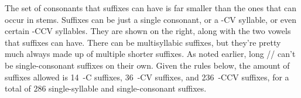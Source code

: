 The
%
set of consonants that suffixes can have is far smaller than the ones that can
occur in stems. Suffixes can be just a single consonant, or a -CV syllable, or
even certain -CCV syllables. They are shown on the right, along with the two
vowels that suffixes can have. There can be multisyllabic suffixes, but they're
pretty much always made up of multiple shorter suffixes. As noted earlier, long
\mbox{//} can't be single-consonant suffixes on their own.
Given the rules below, the amount of suffixes allowed is 14~-C suffixes, 36~-CV
suffixes, and 236~-CCV suffixes, for a total of 286 single-syllable and
single-consonant suffixes.

